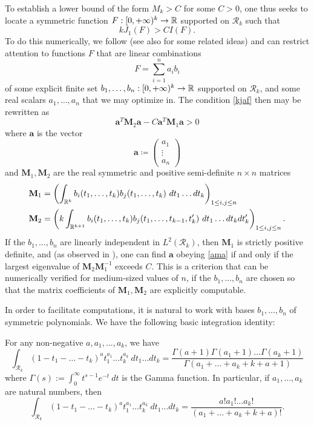 To establish a lower bound of the form $M_k > C$ for some $C > 0$, one thus seeks to locate a symmetric function $F: [0,+\infty)^k \to \mathbb{R}$ supported on ${\mathcal R}_k$ such that
\begin{equation}\label{kjaf}
 k J_1(F) > C I(F).
\end{equation}
To do this numerically, we follow \cite{maynard-new} (see also \cite{gpy} for some related ideas) and can restrict attention to functions $F$ that are linear combinations
$$ F = \sum_{i=1}^n a_i b_i$$
of some explicit finite set $b_1,\dots,b_n: [0,+\infty)^k \to \mathbb{R}$ supported on ${\mathcal R}_k$, and some real scalars $a_1,\dots,a_n$ that we may optimize in.  The condition \eqref{kjaf} then may be rewritten as
\begin{equation}\label{ama}
 \mathbf{a}^T \mathbf{M}_2 \mathbf{a} - C \mathbf{a}^T \mathbf{M}_1 \mathbf{a} > 0
\end{equation}
where $\mathbf{a}$ is the vector
$$ \mathbf{a} \coloneqq \begin{pmatrix} a_1 \\ \vdots \\ a_n \end{pmatrix}
$$
and $\mathbf{M}_1,\mathbf{M}_2$ are the real symmetric and positive semi-definite $n \times n$ matrices
\begin{align}\label{Eq:M1}
\mathbf{M}_1 &= \left( \int_{\mathbb{R}^k} b_i(t_1,\dots,t_k) b_j(t_1,\dots,t_k)\ dt_1 \dots dt_k \right)_{1 \leq i,j \leq n} \\\label{Eq:M2}
\mathbf{M}_2 &= \left( k \int_{\mathbb{R}^{k+1}} b_i(t_1,\dots,t_k) b_j(t_1,\dots,t_{k-1},t'_k)\ dt_1 \dots dt_k dt'_k\right)_{1 \leq i,j \leq n}.
\end{align}
If the $b_1,\dots,b_n$ are linearly independent in $L^2({\mathcal R}_k)$, then $\mathbf{M}_1$ is strictly positive definite, and (as observed in \cite[Lemma 8.3]{maynard-new}), one can find $\mathbf{a}$ obeying \eqref{ama} if and only if the largest eigenvalue of $\mathbf{M}_2 \mathbf{M}_1^{-1}$ exceeds $C$.  This is a criterion that can be numerically verified for medium-sized values of $n$, if the $b_1,\dots,b_n$ are chosen so that the matrix coefficients of $\mathbf{M}_1,\mathbf{M}_2$ are explicitly computable.

In order to facilitate computations, it is natural to work with bases $b_1,\dots,b_n$ of symmetric polynomials.  We have the following basic integration identity:

\begin{lemma}\label{bfi}  For any non-negative $a,a_1,\dots,a_k$, we have
$$ \int_{{\mathcal R}_k} (1-t_1-\dots-t_k)^a t_1^{a_1} \dots t_k^{a_k}\ dt_1 \dots dt_k = \frac{\Gamma(a+1) \Gamma(a_1+1) \dots \Gamma(a_k+1)}{\Gamma(a_1+\dots+a_k+k+a+1)}$$
where $\Gamma(s) := \int_0^\infty t^{s-1} e^{-t}\ dt$ is the Gamma function.  In particular, if $a_1,\dots,a_k$ are natural numbers, then
$$ \int_{{\mathcal R}_k} (1-t_1-\dots-t_k)^a t_1^{a_1} \dots t_k^{a_k}\ dt_1 \dots dt_k = \frac{a! a_1! \dots a_k!}{(a_1+\dots+a_k+k+a)!}.$$
\end{lemma}

